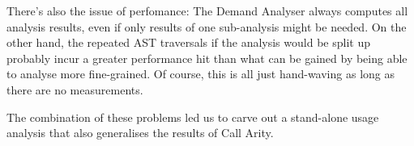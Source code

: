 There's also the issue of perfomance:
The Demand Analyser always computes all analysis results, even if only results of one sub-analysis might be needed.
On the other hand, the repeated AST traversals if the analysis would be split up probably incur a greater performance hit than what can be gained by being able to analyse more fine-grained.
Of course, this is all just hand-waving as long as there are no measurements.

The combination of these problems led us to carve out a stand-alone usage analysis that also generalises the results of Call Arity.
